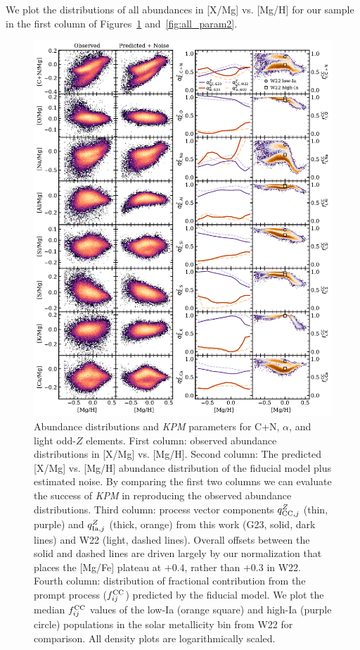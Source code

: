 \documentclass[modern]{aastex631}
\newcommand{\qcc}{q_{{\rm CC,}j}^{Z}}
\newcommand{\qIa}{q_{{\rm Ia,}j}^{Z}}
\newcommand{\fcc}{f_{ij}^{\rm CC}}
\newcommand{\name}{\textsl{KPM}}
\begin{document}
We plot the distributions of all abundances in [X/Mg] vs. [Mg/H] for our sample in the first column of Figures~\ref{fig:all_param1} and~\ref{fig:all_param2}. 

\begin{figure}[htb!]
    \centering
    \includegraphics[width=\textwidth]{all_param1.pdf}
    \caption{Abundance distributions and \name{} parameters for C+N, $\alpha$, and light odd-$Z$ elements. First column: observed abundance distributions in [X/Mg] vs. [Mg/H]. Second column: The predicted [X/Mg] vs. [Mg/H] abundance distribution of the fiducial model plus estimated noise. By comparing the first two columns we can evaluate the success of \name{} in reproducing the observed abundance distributions. Third column: process vector components $\qcc$ (thin, purple) and $\qIa$ (thick, orange) from this work (G23, solid, dark lines) and W22 (light, dashed lines). Overall offsets between the solid and dashed lines are driven largely by our normalization that places the [Mg/Fe] plateau at $+0.4$, rather than $+0.3$ in W22. Fourth column: distribution of fractional contribution from the prompt process ($\fcc$) predicted by the fiducial model. We plot the median $\fcc$ values of the low-Ia (orange square) and high-Ia (purple circle) populations in the solar metallicity bin from W22 for comparison. All density plots are logarithmically scaled.}
    \label{fig:all_param1}
\end{figure}
\end{document}
